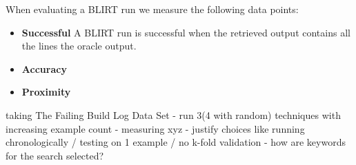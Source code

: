 \documentclass[\myrootdir/main.tex]{subfiles}
\begin{document}
When evaluating a BLIRT run we measure the following data points:
\begin{itemize}
	\item \textbf{Successful} A BLIRT run is successful when the retrieved output contains all the lines the oracle output.
	\item \textbf{Accuracy} 
	\item \textbf{Proximity} 
\end{itemize}

taking The Failing Build Log Data Set - run 3(4 with random) techniques with increasing example count - measuring xyz - justify choices like running chronologically / testing on 1 example / no k-fold validation - how are keywords for the search selected?
\end{document}
